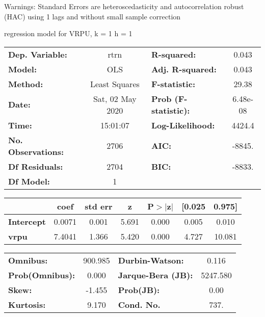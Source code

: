 Warnings: \newline
 [1] Standard Errors are heteroscedasticity and autocorrelation robust (HAC) using 1 lags and without small sample correction\ 

regression model for VRPU, k = 1 h = 1\begin{center}
\begin{tabular}{lclc}
\toprule
\textbf{Dep. Variable:}    &       rtrn       & \textbf{  R-squared:         } &     0.043   \\
\textbf{Model:}            &       OLS        & \textbf{  Adj. R-squared:    } &     0.043   \\
\textbf{Method:}           &  Least Squares   & \textbf{  F-statistic:       } &     29.38   \\
\textbf{Date:}             & Sat, 02 May 2020 & \textbf{  Prob (F-statistic):} &  6.48e-08   \\
\textbf{Time:}             &     15:01:07     & \textbf{  Log-Likelihood:    } &    4424.4   \\
\textbf{No. Observations:} &        2706      & \textbf{  AIC:               } &    -8845.   \\
\textbf{Df Residuals:}     &        2704      & \textbf{  BIC:               } &    -8833.   \\
\textbf{Df Model:}         &           1      & \textbf{                     } &             \\
\bottomrule
\end{tabular}
\begin{tabular}{lcccccc}
                   & \textbf{coef} & \textbf{std err} & \textbf{z} & \textbf{P$> |$z$|$} & \textbf{[0.025} & \textbf{0.975]}  \\
\midrule
\textbf{Intercept} &       0.0071  &        0.001     &     5.691  &         0.000        &        0.005    &        0.010     \\
\textbf{vrpu}      &       7.4041  &        1.366     &     5.420  &         0.000        &        4.727    &       10.081     \\
\bottomrule
\end{tabular}
\begin{tabular}{lclc}
\textbf{Omnibus:}       & 900.985 & \textbf{  Durbin-Watson:     } &    0.116  \\
\textbf{Prob(Omnibus):} &   0.000 & \textbf{  Jarque-Bera (JB):  } & 5247.580  \\
\textbf{Skew:}          &  -1.455 & \textbf{  Prob(JB):          } &     0.00  \\
\textbf{Kurtosis:}      &   9.170 & \textbf{  Cond. No.          } &     737.  \\
\bottomrule
\end{tabular}
\end{center}

